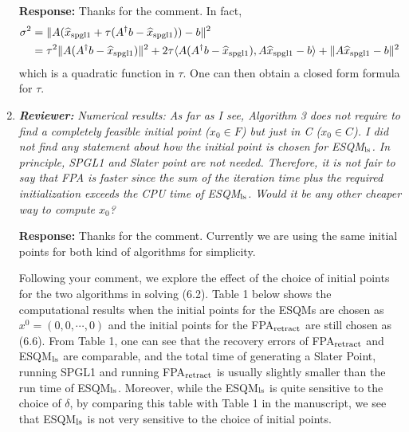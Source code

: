 \documentclass{article}
\begin{document}
\begin{enumerate}
	\textbf{Response:} Thanks for the comment. In fact,
\begin{equation*}
\begin{aligned}
\sigma^2 &= \|A(\widehat x_{\rm spgl1} + \tau(A^\dagger b - \widehat x_{\rm spgl1})) - b\|^2\\
 &=\tau^2\|A(A^\dagger b - \widehat x_{\rm spgl1})\|^2 + 2\tau\langle A(A^\dagger b - \widehat x_{\rm spgl1}),A\widehat x_{\rm spgl1} - b\rangle + \|A\widehat x_{\rm spgl1} - b\|^2
\end{aligned}
\end{equation*}
which is a quadratic function in $\tau$. One can then obtain a closed form formula for $\tau$.


	\item  \textit{\textbf{Reviewer:}} \textit{Numerical results: As far as I see, Algorithm 3 does not require to find a completely feasible initial point ($x_0\in F$) but just in C ($x_0\in C$). I did not find any statement about how the initial point is chosen for ESQM$_{\rm ls}$. In principle, SPGL1 and Slater point are not needed. Therefore, it is not fair to say that FPA is faster since the sum of the iteration time plus the required initialization exceeds the CPU time of ESQM$_{\rm ls}$. Would it be any other cheaper way to compute $x_0$?}
	
	\textbf{Response:} Thanks for the comment. Currently we are using the same initial points for both kind of algorithms for simplicity.

Following your comment, we explore the effect of the choice of initial points for the two algorithms in solving (6.2).
Table 1 below shows the computational results when the initial points for the ESQMs are chosen as
$x^0 = (0, 0, \cdots, 0)$ and the initial points for the FPA$_{\rm retract}$ are still chosen as (6.6). From Table 1, one can see that
the recovery errors of FPA$_{\rm retract}$ and ESQM$_{\rm ls}$ are comparable, and the total time of generating a Slater Point, running SPGL1 and running FPA$_{\rm retract}$ is usually slightly smaller than the run time of ESQM$_{\rm ls}$. Moreover, while the ESQM$_{\rm ls}$ is quite sensitive to the choice of $\delta$, by comparing this table with Table 1 in the manuscript, we see that ESQM$_{\rm ls}$ is not very sensitive to the choice of initial points.



\end{enumerate}
\end{document}
